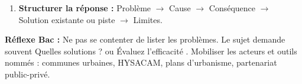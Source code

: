 \documentclass[11pt]{article}
\begin{document}
\begin{methode}
\begin{enumerate}
\begin{itemize}
        \item \textbf{Gouvernance :} décentralisation (transferts de compétences et de ressources aux communes), numérisation de la gestion foncière.
    \end{itemize}
    \item \textbf{Structurer la réponse :} Problème $\rightarrow$ Cause $\rightarrow$ Conséquence $\rightarrow$ Solution existante ou piste $\rightarrow$ Limites.
\end{enumerate}
\textbf{Réflexe Bac :} Ne pas se contenter de lister les problèmes. Le sujet demande souvent \og Quelles solutions ? \fg{} ou \og Évaluez l'efficacité \fg{}. Mobiliser les acteurs et outils nommés : communes urbaines, HYSACAM, plans d'urbanisme, partenariat public-privé.
\end{methode}
\end{document}
